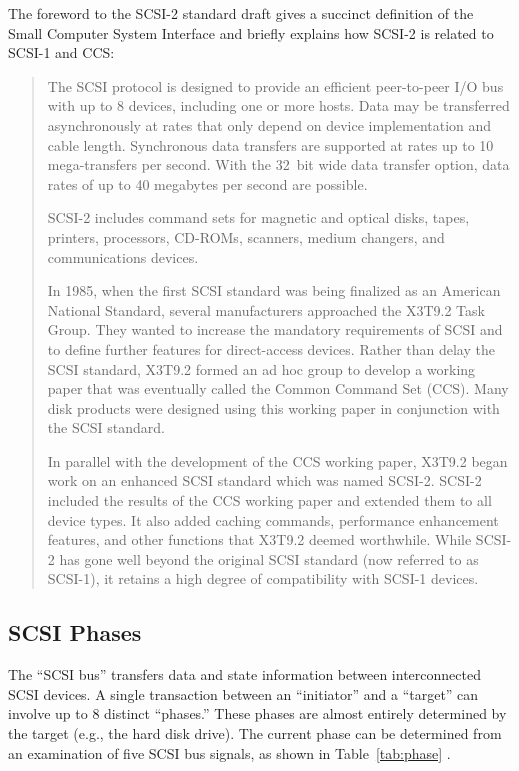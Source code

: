 The foreword to the SCSI-2 standard draft \cite{scsi2.standard} gives a
succinct definition of the Small Computer System Interface and briefly
explains how SCSI-2 is related to SCSI-1 and CCS:
\begin{singlespace}
  \begin{quotation}
    The SCSI protocol is designed to provide an efficient peer-to-peer I/O
    bus with up to 8 devices, including one or more hosts.  Data may be
    transferred asynchronously at rates that only depend on device
    implementation and cable length.  Synchronous data transfers are
    supported at rates up to 10 mega-transfers per second.  With the 32~bit
    wide data transfer option, data rates of up to 40 megabytes per second
    are possible.

    SCSI-2 includes command sets for magnetic and optical disks, tapes,
    printers, processors, CD-ROMs, scanners, medium changers, and
    communications devices.

    In 1985, when the first SCSI standard was being finalized as an
    American National Standard, several manufacturers approached the X3T9.2
    Task Group.  They wanted to increase the mandatory requirements of SCSI
    and to define further features for direct-access devices.  Rather than
    delay the SCSI standard, X3T9.2 formed an ad hoc group to develop a
    working paper that was eventually called the Common Command Set
    (CCS)\@.  Many disk products were designed using this working paper in
    conjunction with the SCSI standard.

    In parallel with the development of the CCS working paper, X3T9.2 began
    work on an enhanced SCSI standard which was named SCSI-2.  SCSI-2
    included the results of the CCS working paper and extended them to all
    device types.  It also added caching commands, performance enhancement
    features, and other functions that X3T9.2 deemed worthwhile.  While
    SCSI-2 has gone well beyond the original SCSI standard (now referred to
    as SCSI-1), it retains a high degree of compatibility with SCSI-1
    devices.
  \end{quotation}
\end{singlespace}


\subsection{SCSI Phases}
\label{sec:status}
\label{sec:message}

The ``SCSI bus'' transfers data and state information between
interconnected SCSI devices.  A single transaction between an ``initiator''
and a ``target'' can involve up to 8 distinct ``phases.''  These phases are
almost entirely determined by the target (e.g., the hard disk drive).  The
current phase can be determined from an examination of five SCSI bus
signals, as shown in Table~\ref{tab:phase} \cite[p.~57]{lxt.manual}.


